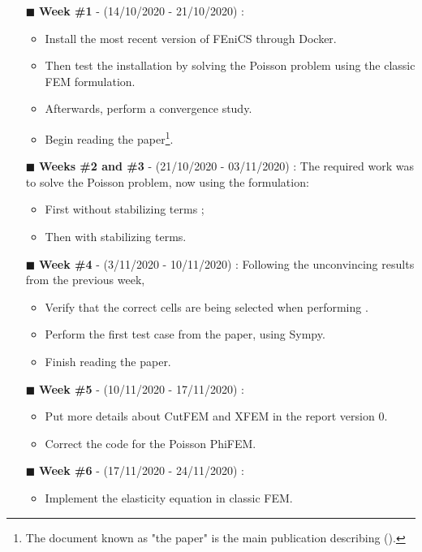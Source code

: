 \begin{itemize}
    \item[$\blacksquare$] \textbf{Week \#1} - (14/10/2020 - 21/10/2020) : \begin{itemize}
        \item Install the most recent version of FEniCS through Docker.
        \item Then test the installation by solving the Poisson problem using the classic FEM formulation.
        \item Afterwards, perform a convergence study.
        \item Begin reading the paper\footnote{The document known as "the paper" is the main publication describing \phifem (\cite{Reference3}).}.
    \end{itemize}  
    \item[$\blacksquare$] \textbf{Weeks \#2 and \#3} - (21/10/2020 - 03/11/2020) : The required work was to solve the Poisson problem, now using the \phifem  formulation:\begin{itemize}
        \item First without stabilizing terms ;
        \item Then with stabilizing terms.
    \end{itemize}
    \item[$\blacksquare$] \textbf{Week \#4} - (3/11/2020 - 10/11/2020) : Following the unconvincing results from the previous week, \begin{itemize}
        \item Verify that the correct cells are being selected when performing \phifem.
        \item Perform the first test case from the paper, using Sympy.
        \item Finish reading the paper.
    \end{itemize} 
    \item[$\blacksquare$] \textbf{Week \#5} - (10/11/2020 - 17/11/2020) : \begin{itemize}
        \item Put more details about CutFEM and XFEM in the report version 0.
        \item Correct the code for the Poisson PhiFEM.
    \end{itemize} 
    \item[$\blacksquare$] \textbf{Week \#6} - (17/11/2020 - 24/11/2020) : \begin{itemize}
        \item Implement the elasticity equation in classic FEM.

\end{itemize}
\end{itemize}
